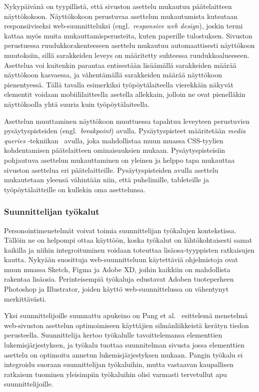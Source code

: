 \documentclass[finnish, 12pt, a4paper, elec, utf8, a-1b, online]{aaltothesis}
\begin{document}
Nykypäivänä on tyypillistä, että sivuston asettelu mukautuu päätelaitteen
näyttökokoon. Näyttökokoon perustuvaa asettelun mukautumista kutsutaan
responsiiviseksi web-suunnitteluksi (engl.\ \textit{responsive web design}),
joskin termi kattaa myös muita mukauttamisperusteita, kuten paperille
tulostuksen. Sivuston perustuessa ruudukkorakenteeseen asettelu mukautuu
automaattisesti näyttökoon muutoksiin, sillä sarakkeiden leveys on määritetty
suhteessa ruudukkoalueeseen. Asettelua voi kuitenkin parantaa entisestään
lisäämällä sarakkeiden määrää näyttökoon kasvaessa, ja vähentämällä sarakkeiden
määrää näyttökoon pienentyessä. Tällä tavalla esimerkiksi työpöytälaiteella
vierekkäin näkyvät elementit voidaan mobiililaitteella asetella allekkain,
jolloin ne ovat pienelläkin näyttökoolla yhtä suuria kuin työpöytälaiteella.

Asettelun muuttaminen näyttökoon muuttuessa tapahtuu leveyteen perustuvien
pysäytyspisteiden (engl.\ \textit{breakpoint}) avulla. Pysäytyspisteet
määritetään \textit{media queries} -tekniikan~\cite{Rivoal:12:MQ} avulla, joka
mahdollistaa muun muassa CSS-tyylien kohdentamisen päätelaitteen ominaisuuksien
mukaan. Pysäytyspisteisiin pohjautuva asettelun mukauttaminen on yleinen ja
helppo tapa mukauttaa sivuston asettelua eri päätelaitteille. Pysäytyspisteiden
avulla asettelu mukautetaan yleensä vähintään niin, että puhelimille,
tableteille ja työpöytälaitteille on kullekin oma asettelunsa.

\subsubsection{Suunnittelijan työkalut}

Personointimenetelmät voivat toimia suunnittelijan työkalujen kontekstissa.
Tällöin ne on helpompi ottaa käyttöön, koska työkalut on lähtökohtaisesti samat
kaikilla ja niihin integroituminen voidaan toteuttaa lisäosa-tyyppisten
ratkaisujen kautta. Nykyään suosittuja web-suunnitteluun käytettäviä
ohjelmistoja ovat muun muassa Sketch, Figma ja Adobe XD, joihin kaikkiin on
mahdollista rakentaa lisäosia. Perinteisempiä työkaluja edustavat Adoben
tuoteperheen Photoshop ja Illustrator, joiden käyttö web-suunnittelussa on
vähentynyt merkittävästi.

Yksi suunnittelijoille suunnattu apukeino on Pang et al.~\cite{Pang2016}
esittelemä menetelmä web-sivuston asettelun optimoimiseen käyttäjien
silmänliikkeistä kerätyn tiedon perusteella. Suunnittelija kertoo työkalulle
tavoittelemansa elementtien lukemisjärjestyksen, ja työkalu tuottaa suunnitelman
sivusta jossa elementtien asettelu on optimoitu annetun lukemisjärjestyksen
mukaan. Pangin työkalu ei integroidu suoraan suunnittelijan työkaluihin, mutta
vastaavan kaupallisen ratkaisun tuominen yleisimpiin työkaluihin olisi varmasti
tervetullut apu suunnittelijoille.
\end{document}
